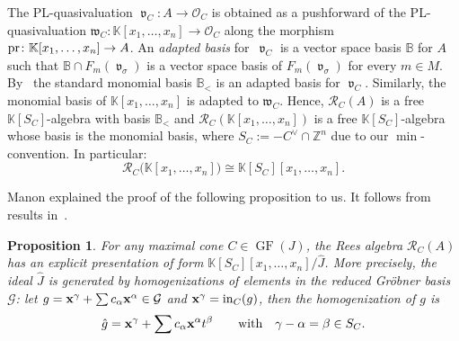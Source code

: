 \documentclass[10pt,a4paper]{amsart}
\newcommand{\thlabel}[1]{\label{#1}}
\newtheorem{Proposition}[Theorem]{Proposition}
\numberwithin{equation}{section}
\DeclareMathOperator{\init}{in}
\DeclareMathOperator{\GF}{GF}
\DeclareMathOperator{\val}{\mathfrak v}
\begin{document}
The PL-quasivaluation $\val_C\colon A\to \mathcal O_C$ is obtained as a pushforward of the PL-quasivaluation $\mathfrak{w}_C\colon \mathbb K[x_1,\dots,x_n]\to \mathcal O_C$ along the morphism ${\rm pr}\colon \mathbb K[x_1,\dots,x_n]\to A$.
An {\it adapted basis} for~$\val_C$ is a vector space basis $\mathbb B$ for $A$ such that $\mathbb B\cap F_m(\val_\sigma)$ is a vector space basis of $F_m(\val_\sigma)$ for every $m\in M$.
By~\cite{KM-toricbundles} the standard monomial basis $\mathbb B_<$ is an adapted basis for $\val_C$.
Similarly, the monomial basis of $\mathbb K[x_1,\dots,x_n]$ is adapted to $\mathfrak{w}_C$.
Hence, $\mathcal R_C(A)$ is a free $\mathbb K[S_C]$-algebra with basis $\mathbb B_<$ and $\mathcal R_C(\mathbb K[x_1,\dots,x_n])$ is a free $\mathbb K[S_C]$-algebra whose basis is the monomial basis, where $S_C:=-C^\vee \cap \mathbb Z^n$ due to our $\min$-convention.
In particular: %
\begin{equation}\label{eq:Rees poly}
\mathcal R_C\big(\mathbb K[x_1,\dots,x_n]\big)\cong \mathbb K[S_C][x_1,\dots,x_n].
\end{equation}

Manon explained the proof of the following proposition to us. It follows from results in~\cite{KM-toricbundles}.

\begin{Proposition}\thlabel{prop:Rees quotient}
For any maximal cone $C\in\GF(J)$, the Rees algebra $\mathcal R_C(A)$ has an explicit presentation of form $\mathbb K[S_C][x_1,\dots,x_n]/\hat J$.
More precisely, the ideal $\hat J$ is generated by homogenizations of elements in the reduced Gr\"obner basis $\mathcal G$:
let $g={\bf x}^\gamma+\sum c_\alpha{\bf x}^\alpha\in \mathcal G$ and ${\bf x}^\gamma=\init_C(g)$, then the {\it homogenization} of $g$ is
\begin{equation}\label{eq:homog}
\hat g= {\bf x}^\gamma+\sum c_\alpha {\bf x}^\alpha t^\beta\qquad \text{with}\quad \gamma-\alpha=\beta\in S_C.
\end{equation}
\end{Proposition}
\end{document}
